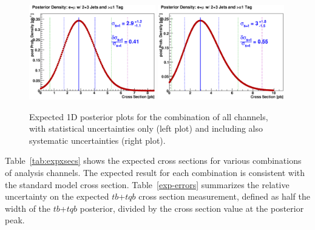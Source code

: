 \vspace{0.1in}
\begin{figure}[!h!tbp]
\includegraphics[width=0.49\textwidth]
{eps/MatrixElement/posterior/nosys/expected_limit_TBTQ_LeptonsCombined_JetsCombined_TagsCombined}
\includegraphics[width=0.49\textwidth]
{eps/MatrixElement/posterior/sys/expected_limit_TBTQ_LeptonsCombined_JetsCombined_TagsCombined}
\vspace{-0.1in}
\caption{Expected 1D posterior plots for the
combination of all channels, with statistical uncertainties only (left
plot) and including also systematic uncertainties (right plot).}
\label{exp-post-1d-allj}
\end{figure}

Table~\ref{tab:expxsecs} shows the expected cross sections for various
combinations of analysis channels. The expected result for each
combination is consistent with the standard model cross
section. Table~\ref{exp-errors} summarizes the relative uncertainty on
the expected $tb$+$tqb$ cross section measurement, defined as half the
width of the $tb$+$tqb$ posterior, divided by the cross section value
at the posterior peak.


